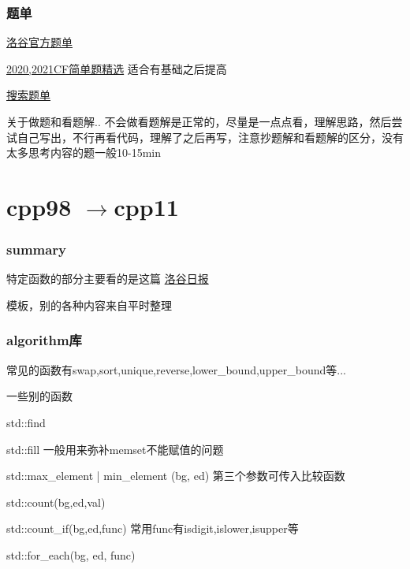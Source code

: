 \documentclass{beamer}
\begin{document}
  \begin{frame}
    \frametitle{题单}
    \href{https://www.luogu.com.cn/training/list?type=official&page=1}{洛谷官方题单}

    \href{https://www.luogu.com.cn/training/2018}{2020,2021CF简单题精选} 适合有基础之后提高

    \vspace*{1\baselineskip}
    
    \href{https://www.luogu.com.cn/training/9376}{搜索题单}
    
    \vspace*{1\baselineskip}
    
    关于做题和看题解.. 不会做看题解是正常的，尽量是一点点看，理解思路，然后尝试自己写出，不行再看代码，理解了之后再写，注意抄题解和看题解的区分，没有太多思考内容的题一般10-15min
  \end{frame}

  \section{cpp98 \texorpdfstring{$\to$}\ cpp11}

  \begin{frame}
    \frametitle{summary}
    特定函数的部分主要看的是这篇
    \href{https://www.luogu.com.cn/blog/AccRobin/grammar-candies}{洛谷日报}
  
    \vspace*{2\baselineskip}
  
    模板，别的各种内容来自平时整理
  
  \end{frame}
  
  \begin{frame}
    \frametitle{algorithm库}
    常见的函数有swap,sort,unique,reverse,lower\_bound,upper\_bound等...
    
    一些别的函数

    std::find

    std::fill 一般用来弥补memset不能赋值的问题

    std::max\_element | min\_element (bg, ed) 第三个参数可传入比较函数

    std::count(bg,ed,val)
  
    std::count\_if(bg,ed,func) 常用func有isdigit,islower,isupper等

    std::for\_each(bg, ed, func)
  \end{frame}
\end{document}
